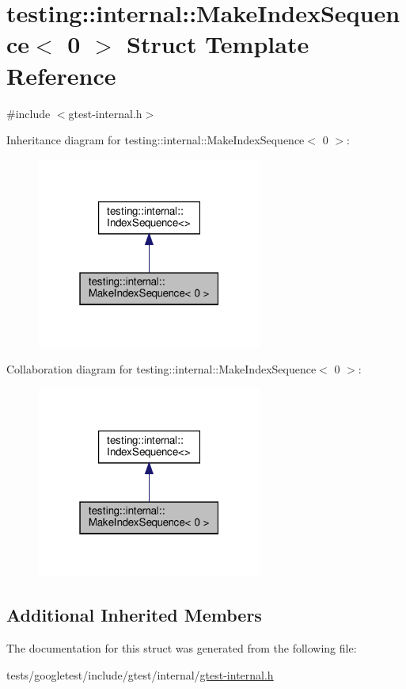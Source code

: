 \hypertarget{structtesting_1_1internal_1_1MakeIndexSequence_3_010_01_4}{}\section{testing\+:\+:internal\+:\+:Make\+Index\+Sequence$<$ 0 $>$ Struct Template Reference}
\label{structtesting_1_1internal_1_1MakeIndexSequence_3_010_01_4}


{\ttfamily \#include $<$gtest-\/internal.\+h$>$}



Inheritance diagram for testing\+:\+:internal\+:\+:Make\+Index\+Sequence$<$ 0 $>$\+:\nopagebreak
\begin{figure}[H]
\begin{center}
\leavevmode
\includegraphics[width=211pt]{structtesting_1_1internal_1_1MakeIndexSequence_3_010_01_4__inherit__graph}
\end{center}
\end{figure}


Collaboration diagram for testing\+:\+:internal\+:\+:Make\+Index\+Sequence$<$ 0 $>$\+:\nopagebreak
\begin{figure}[H]
\begin{center}
\leavevmode
\includegraphics[width=211pt]{structtesting_1_1internal_1_1MakeIndexSequence_3_010_01_4__coll__graph}
\end{center}
\end{figure}
\subsection*{Additional Inherited Members}


The documentation for this struct was generated from the following file\+:\begin{DoxyCompactItemize}
\item 
tests/googletest/include/gtest/internal/\hyperlink{gtest-internal_8h}{gtest-\/internal.\+h}\end{DoxyCompactItemize}
